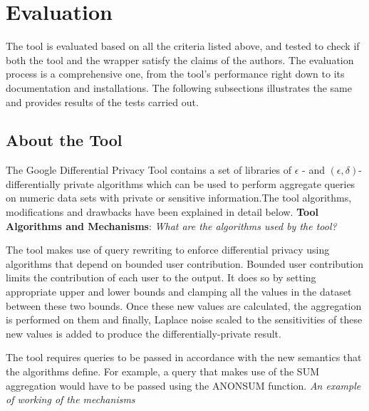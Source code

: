\documentclass[acmsmall]{acmart}
\begin{document}
\section{Evaluation}\label{4}
The tool is evaluated based on all the criteria listed above, and tested to check if both the tool and the wrapper satisfy the claims of the authors. The evaluation process is a comprehensive one, from the tool's performance right down to its documentation and installations. The following subsections illustrates the same and provides results of the tests carried out.

\subsection{About the Tool}\label{4.1}
The Google Differential Privacy Tool contains a set of libraries of \begin{math}\epsilon\end{math} - and \begin{math}(\epsilon, \delta) \end{math}- differentially private algorithms which can be used to perform aggregate queries on numeric data sets with private or sensitive information.The tool algorithms, modifications and drawbacks have been explained in detail below.
\newline
\newline
\textbf{Tool Algorithms and Mechanisms}:
\newline
\newline
\textit{What are the algorithms used by the tool?}

The tool makes use of query rewriting to enforce differential privacy using algorithms that depend on bounded user contribution. Bounded user contribution limits the contribution of each user to the output. It does so by setting appropriate upper and lower bounds and clamping all the values in the dataset between these two bounds. Once these new values are calculated, the aggregation is performed on them and finally, Laplace noise scaled to the sensitivities of these new values is added to produce the differentially-private result.

The tool requires queries to be passed in accordance with the new semantics that the algorithms define. For example, a query that makes use of the SUM aggregation would have to be passed using the ANON\textunderscore SUM function.
\newline
\newline
\textit{An example of working of the mechanisms}
\end{document}

